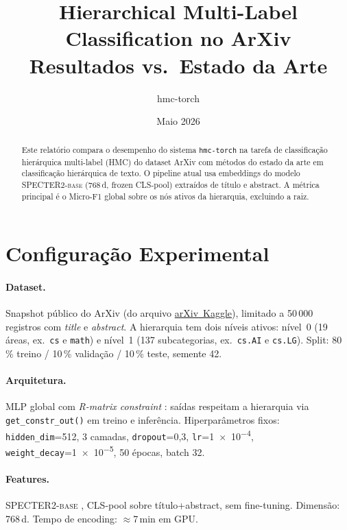\documentclass[11pt,a4paper]{article}
\title{\textbf{Hierarchical Multi-Label Classification no ArXiv}\\[0.4em]
       \large Resultados vs.\ Estado da Arte}
\author{hmc-torch}
\date{Maio 2026}
\begin{document}
\maketitle

\begin{abstract}
Este relatório compara o desempenho do sistema \texttt{hmc-torch} na tarefa de classificação
hierárquica multi-label (HMC) do dataset ArXiv com métodos do estado da arte em
classificação hierárquica de texto. O pipeline atual usa embeddings do modelo
\textsc{SPECTER2-base} \cite{cohan2020specter} (768\,d, frozen CLS-pool) extraídos de
título e abstract. A métrica principal é o Micro-F1 global sobre os nós ativos da
hierarquia, excluindo a raiz.
\end{abstract}

\section{Configuração Experimental}

\paragraph{Dataset.}
Snapshot público do ArXiv (do arquivo \href{https://www.kaggle.com/datasets/Cornell-University/arxiv}{arXiv~Kaggle}),
limitado a 50\,000 registros com \textit{title} e \textit{abstract}.
A hierarquia tem dois níveis ativos: nível~0 (19 áreas, ex.\ \texttt{cs} e \texttt{math})
e nível~1 (137 subcategorias, ex.\ \texttt{cs.AI} e \texttt{cs.LG}).
Split: 80\,\% treino / 10\,\% validação / 10\,\% teste, semente 42.

\paragraph{Arquitetura.}
MLP global com \textit{R-matrix constraint} \cite{giunchiglia2020coherent}:
saídas respeitam a hierarquia via \texttt{get\_constr\_out()} em treino e inferência.
Hiperparâmetros fixos: \texttt{hidden\_dim}=512, 3 camadas, \texttt{dropout}=0,3,
\texttt{lr}=\num{1e-4}, \texttt{weight\_decay}=\num{1e-5}, 50 épocas, batch 32.

\paragraph{Features.}
\textsc{SPECTER2-base} \cite{cohan2020specter}, CLS-pool sobre título+abstract,
sem fine-tuning. Dimensão: 768\,d. Tempo de encoding: $\approx$7\,min em GPU.
\end{document}
